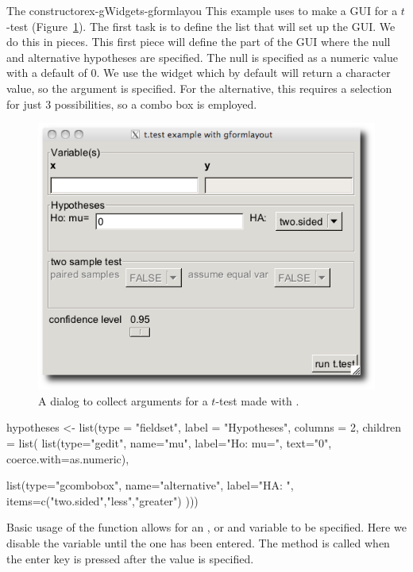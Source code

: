 \begin{example}{The  constructor}{ex-gWidgets-gformlayou}
This example uses  to make a GUI for a $t$-test (Figure~\ref{fig:ex-gWidgets-formlayout}). The
first task is to define the list that will set up the GUI. We do this
in pieces. This first piece will define the part of the GUI where the
null and alternative hypotheses are specified. The null is specified
as a numeric value with a default of 0. We use the  widget
which by default will return a character value, so the
 argument is specified. For the alternative, this
requires a selection for just 3 possibilities, so a combo box is
employed.
\begin{figure}
  \centering
  \includegraphics[width=.65\textwidth]{ex-gWidgets-formlayout}
  \caption{A dialog to collect arguments for a $t$-test made with .}
  \label{fig:ex-gWidgets-formlayout}
\end{figure}


\begin{Schunk}
\begin{Sinput}
 hypotheses <- 
   list(type = "fieldset",
        label = "Hypotheses",
        columns = 2, 
        children = list(
          list(type="gedit",                            
               name="mu", label="Ho: mu=",
               text="0", coerce.with=as.numeric),
          
          list(type="gcombobox",
               name="alternative", label="HA: ",
               items=c("two.sided","less","greater")
               )))
\end{Sinput}
\end{Schunk}

Basic usage of the  function allows for an , or
 and  variable to be specified. Here we disable the
 variable until the  one has been entered. The
 method is called when the enter key is
pressed after the  value is specified.


\end{example}
